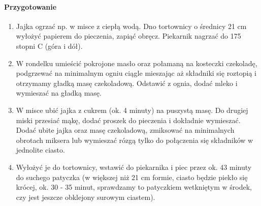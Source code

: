 \documentclass{article}
\begin{document}
    \paragraph{Przygotowanie}
    \begin{enumerate}
        \item Jajka ogrzać np. w misce z ciepłą wodą. Dno tortownicy o średnicy
            21 cm wyłożyć papierem do pieczenia, zapiąć obręcz. Piekarnik
            nagrzać do 175 stopni C (góra i dół).
        \item W rondelku umieścić pokrojone masło oraz połamaną na kosteczki
            czekoladę, podgrzewać na minimalnym ogniu ciągle mieszając aż
            składniki się roztopią i otrzymamy gładką masę czekoladową. Odstawić
            z ognia, dodać mleko i wymieszać na gładką masę.
        \item W misce ubić jajka z cukrem (ok. 4 minuty) na puszystą masę. Do
            drugiej miski przesiać mąkę, dodać proszek do pieczenia i dokładnie
            wymieszać. Dodać ubite jajka oraz masę czekoladową, zmiksować na
            minimalnych obrotach miksera lub wymieszać rózgą tylko do połączenia
            się składników w jednolite ciasto.
        \item Wyłożyć je do tortownicy, wstawić do piekarnika i piec przez ok.
            43 minuty do suchego patyczka (w większej niż 21 cm formie, ciasto
            będzie piekło się krócej, ok. 30 - 35 minut, sprawdzamy to
            patyczkiem wetkniętym w środek, czy jest jeszcze obklejony surowym
            ciastem).
    \end{enumerate}
    \newpage
\end{document}
